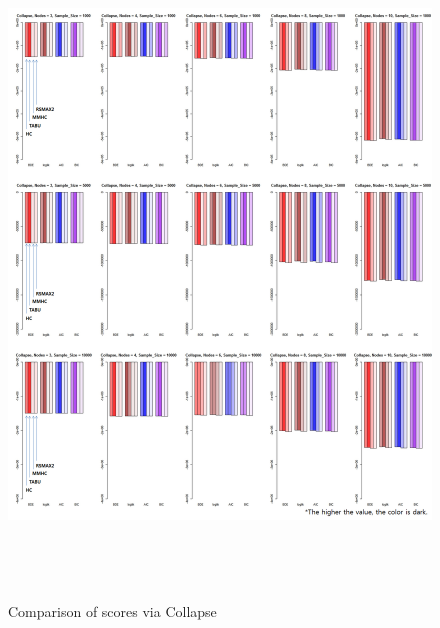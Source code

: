 	\begin{figure}[p]
	\centering
		\includegraphics[height=500pt]{images/01_Collapse_Score}
		\caption{Comparison of scores via Collapse}
	\end{figure}	

